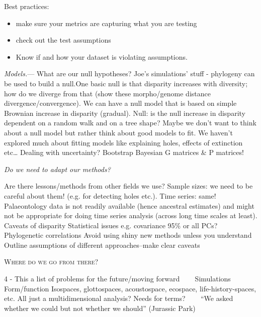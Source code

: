 \documentclass[12pt,letterpaper]{article}
\renewcommand{\section}[1]{%
\bigskip
\begin{center}
\begin{Large}
\normalfont\scshape #1
\medskip
\end{Large}
\end{center}}
\renewcommand{\subsection}[1]{%
\bigskip
\begin{center}
\begin{large}
\normalfont\itshape #1
\end{large}
\end{center}}
\renewcommand{\subsubsection}[1]{%
\vspace{2ex}
\noindent
\textit{#1.}---}
\begin{document}
Best practices:
\begin{itemize}
\item make sure your metrics are capturing what you are testing
\item check out the test assumptions
\item Know if and how your dataset is violating assumptions.
\end{itemize}

\subsubsection{Models}
What are our null hypotheses?
Joe’s simulations’ stuff - phylogeny can be used to build a null.One basic null is that disparity increases with diversity; how do we diverge from that (show these morpho/genome distance divergence/convergence).
We can have a null model that is based on simple Brownian increase in disparity (gradual). 
Null: is the null increase in disparity dependent on a random walk and on a tree shape?
Maybe we don’t want to think about a null model but rather think about good models to fit. 
We haven’t explored much about fitting models like explaining holes, effects of extinction etc…
Dealing with uncertainty? Bootstrap Bayesian G matrices \& P matrices!


\subsection{Do we need to adapt our methods?}
Are there lessons/methods from other fields we use?
Sample sizes: we need to be careful about them! (e.g. for detecting holes etc.).
Time series: same! Palaeontology data is not readily available (hence ancestral estimates) and might not be appropriate for doing time series analysis (across long time scales at least).
Caveats of disparity
Statistical issues e.g. covariance
95\% or all PCs?
Phylogenetic correlations
Avoid using shiny new methods unless you understand
Outline assumptions of different approaches--make clear caveats



\section{Where do we go from there?}
4 - This a list of problems for the future/moving forward
    Simulations 
    Form/function
Isospaces, glottospaces, acoustospace, ecospace, life-history-spaces, etc. All just a multidimensional analysis? Needs for terms?
    
``We asked whether we could but not whether we should'' (Jurassic Park)
\end{document}
